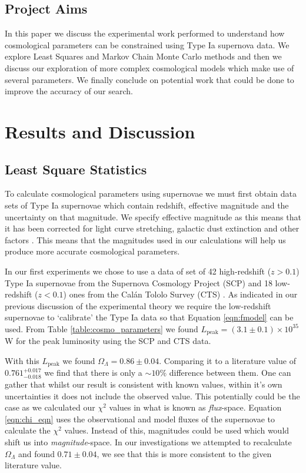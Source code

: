 \documentclass[twocolumn]{revtex4}
\begin{document}
\vspace{-5ex}
\subsection{Project Aims}
\vspace{-2ex}
In this paper we discuss the experimental work performed to understand how cosmological parameters can be constrained using Type Ia supernova data. We explore Least Squares and Markov Chain Monte Carlo methods and then we discuss our exploration of more complex cosmological models which make use of several parameters. We finally conclude on potential work that could be done to improve the accuracy of our search.

\vspace{-3ex}
\section{Results and Discussion} 
\label{sec:results_discussion}
\vspace{-3ex}
\subsection{Least Square Statistics} 
\vspace{-2ex}
To calculate cosmological parameters using supernovae we must first obtain data sets of Type Ia supernovae which contain redshift, effective magnitude and the uncertainty on that magnitude. We specify effective magnitude as this means that it has been corrected for light curve stretching, galactic dust extinction and other factors \cite{script}. This means that the magnitudes used in our calculations will help us produce more accurate cosmological parameters. 

In our first experiments we chose to use a data of set of 42 high-redshift ($z>0.1$) Type Ia supernovae from the Supernova Cosmology Project (SCP) and 18 low-redshift ($z<0.1$) ones from the Cal\'{a}n Tololo Survey (CTS) \cite{dataset_1}. As indicated in our previous discussion of the experimental theory we require the low-redshift supernovae to `calibrate' the Type Ia data so that Equation \ref{eqn:fmodel} can be used. From Table \ref{table:cosmo_parameters} we found $L_{\text{peak}} = (3.1\pm0.1) \times 10^{35}$ W for the peak luminosity using the SCP and CTS data.

With this $L_\text{peak}$ we found $\Omega_\Lambda=0.86\pm0.04$. Comparing it to a literature value of $0.761^{+0.017}_{-0.018}$ \cite{cosmo_constraints} we find that there is only a $\sim 10 \%$ difference between them. One can gather that whilst our result is consistent with known values, within it's own uncertainties it does not include the observed value. This potentially could be the case as we calculated our $\chi^2$ values in what is known as \textit{flux}-space. Equation \ref{eqn:chi_eqn} uses the observational and model fluxes of the supernovae to calculate the $\chi^2$ values. Instead of this, magnitudes could be used which would shift us into \textit{magnitude}-space. In our investigations we attempted to recalculate $\Omega_\Lambda$ and found $0.71\pm0.04$, we see that this is more consistent to the given literature value.
\end{document}
